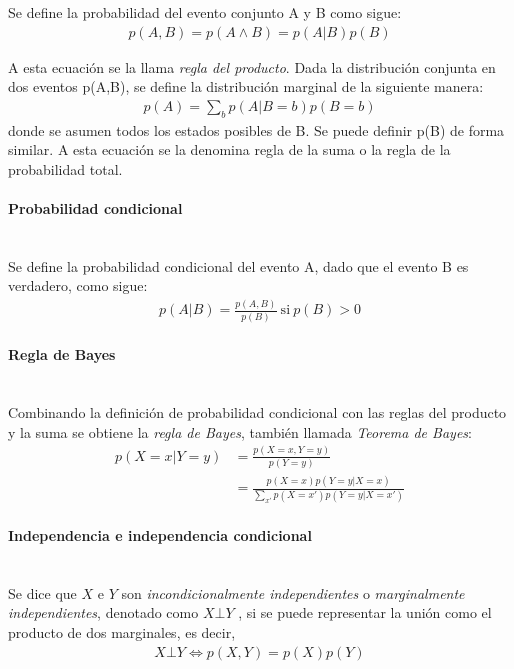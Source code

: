 		Se define la probabilidad del evento conjunto A y B como sigue:
		\begin{align}
			p(A,B) = p(A \land B) = p(A|B)p(B)
		\end{align}

		A esta ecuación se la llama \textit{regla del producto}. Dada la distribución conjunta en dos eventos p(A,B), se define la distribución marginal de la siguiente manera:
		\begin{align}
			p(A)=\sum_{b}p(A|B=b)p(B=b)
		\end{align}
		donde se asumen todos los estados posibles de B. Se puede definir p(B) de forma similar. A esta ecuación se la denomina regla de la suma o la regla de la probabilidad total.
		
	\paragraph*{Probabilidad condicional} ~\\
	
		Se define la probabilidad condicional del evento A, dado que el evento B es verdadero, como sigue:
		\begin{align}
			p(A|B) = \frac{p(A,B)}{p(B)} ~\text{si}~ p(B)>0
		\end{align}
		
	\paragraph*{Regla de Bayes} ~\\
		
		Combinando la definición de probabilidad condicional con las reglas del producto y la suma se obtiene la \textit{regla de Bayes}, también llamada \textit{Teorema de Bayes}:
		\begin{align}\label{eq:bayes}
			p(X=x|Y=y) &= \frac{p(X=x,Y=y)}{p(Y=y)} \\
			&= \frac{p(X=x)p(Y=y|X=x)}{\sum_{x'}p(X=x')p(Y=y|X=x')}
		\end{align}

	\paragraph*{Independencia e independencia condicional} ~\\
	
		Se dice que $X$ e $Y$ son \textit{incondicionalmente independientes} o \textit{marginalmente independientes}, denotado como $X \bot Y$	, si se puede representar la unión como el producto de dos marginales, es decir,
	\begin{align}
		X \bot Y \Longleftrightarrow p(X,Y) = p(X)p(Y)
	\end{align}			
			

